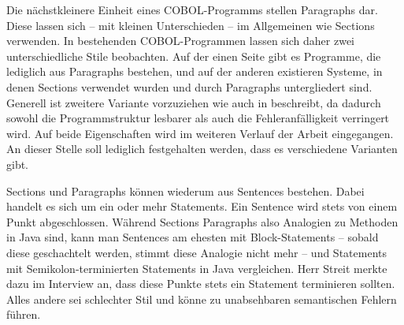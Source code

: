 Die nächstkleinere Einheit eines COBOL-Programms stellen Paragraphs dar. Diese lassen sich -- mit kleinen Unterschieden -- im Allgemeinen wie Sections verwenden. In bestehenden COBOL-Programmen lassen sich daher zwei unterschiedliche Stile beobachten. Auf der einen Seite gibt es Programme, die lediglich aus Paragraphs bestehen, und auf der anderen existieren Systeme, in denen Sections verwendet wurden und durch Paragraphs untergliedert sind. Generell ist zweitere Variante vorzuziehen wie auch \citeauthor{richards_enhancing_1984} in  beschreibt, da dadurch sowohl die Programmstruktur lesbarer als auch die Fehleranfälligkeit verringert wird. Auf beide Eigenschaften wird im weiteren Verlauf der Arbeit eingegangen. An dieser Stelle soll lediglich festgehalten werden, dass es verschiedene Varianten gibt.

Sections und Paragraphs können wiederum aus Sentences bestehen. Dabei handelt es sich um ein oder mehr Statements. Ein Sentence wird stets von einem Punkt abgeschlossen. Während Sections Paragraphs also Analogien zu Methoden in Java sind, kann man Sentences am ehesten mit Block-Statements -- sobald diese geschachtelt werden, stimmt diese Analogie nicht mehr -- und Statements mit Semikolon-terminierten Statements in Java vergleichen. Herr Streit merkte dazu im Interview an, dass diese Punkte stets ein Statement terminieren sollten. Alles andere sei schlechter Stil und könne zu unabsehbaren semantischen Fehlern führen. 

